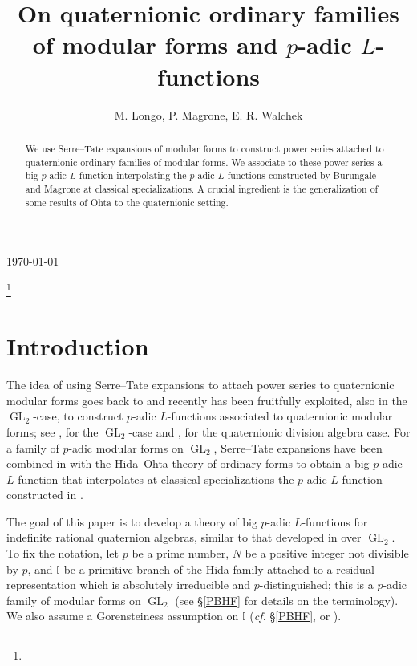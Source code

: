 \documentclass[a4paper,11pt]{amsart}
\numberwithin{equation}{section}
\theoremstyle{plain}
\theoremstyle{definition}
\theoremstyle{remark}
\newcommand{\I}{\mathbb{I}}
\DeclareMathOperator{\GL}{GL}
\begin{document}


\title[On quaternionic ordinary families of modular forms and $p$-adic $L$-functions]{On quaternionic ordinary families of modular forms and $p$-adic $L$-functions}
\today
\date{}
\author{M. Longo, P. Magrone, E. R. Walchek}

\thanks{}

\begin{abstract} We use Serre--Tate expansions of modular forms to construct power series attached to quaternionic ordinary families of modular forms. We associate to these power series a big $p$-adic $L$-function interpolating the $p$-adic $L$-functions constructed by Burungale and Magrone at classical specializations. A crucial ingredient is the generalization of some results of Ohta to the quaternionic setting. 
\end{abstract}

\address{Dipartimento di Matematica, Universit\`a di Padova, Via Trieste 63, 35121 Padova, Italy}

\subjclass[2010]{}


\maketitle


\section{Introduction}\label{Intro}

The idea of using Serre--Tate expansions to attach power series to quaternionic modular forms goes back to \cite{Mori2, Mori, Mori1} and recently has been fruitfully exploited, also in the $\GL_2$-case, to construct $p$-adic $L$-functions associated to quaternionic modular forms; see \cite{Brako, CH}, for the $\GL_2$-case and \cite{Mori2, Brooks, Burungale, Magrone}, for the quaternionic division algebra case. For a family of $p$-adic modular forms on $\GL_2$, Serre--Tate expansions have been combined in \cite{Castella} with the Hida--Ohta theory of ordinary forms to obtain a big $p$-adic $L$-function that interpolates at classical specializations the $p$-adic $L$-function constructed in \cite{CH}. 

The goal of this paper is to develop a theory of big $p$-adic $L$-functions for indefinite rational quaternion algebras, similar to that developed in \cite{Castella} over $\GL_2$. To fix the notation, let $p$ be a prime number, $N$ be a positive integer not divisible by $p$, and $\I$ be a primitive branch of the Hida family attached to a residual representation which is absolutely irreducible and $p$-distinguished; this is a $p$-adic family of modular forms on $\GL_2$ (see \S\ref{PBHF} for details on the terminology). We also assume a Gorensteiness assumption on $\I$ (\emph{cf.} \S\ref{PBHF}, or 
\cite[Assumption 6.2]{LV-MM}).
\end{document}
